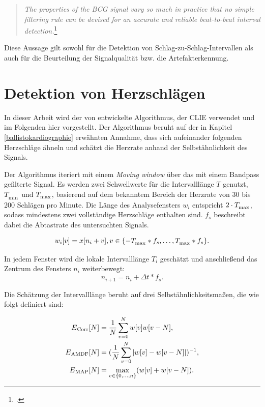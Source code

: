 	\begin{quote}\textit{The properties of the BCG signal vary so much in practice that no simple filtering rule can be devised for an accurate and reliable beat-to-beat interval detection.}\footcite{Paalasmaa2015}\end{quote}
	
	Diese Aussage gilt sowohl für die Detektion von Schlag-zu-Schlag-Intervallen als auch für die Beurteilung der Signalqualität bzw. die Artefakterkennung.

\section{Detektion von Herzschlägen}\label{CLIE}

	In dieser Arbeit wird der von \citeauthor{Bruser2013} entwickelte Algorithmus, der \acf{CLIE} verwendet und im Folgenden hier vorgestellt. Der Algorithmus beruht auf der in Kapitel \ref{ballistokardiographie} erwähnten Annahme, dass sich aufeinander folgenden Herzschläge ähneln und schätzt die Herzrate anhand der Selbstähnlichkeit des Signals.


	Der Algorithmus iteriert mit einem \textit{Moving window} über das mit einem Bandpass gefilterte Signal. Es werden zwei Schwellwerte für die Intervalllänge $T$ genutzt, $T_\textsubscript{min}$ und $T_\textsubscript{max}$, basierend auf dem bekanntem Bereich der Herzrate von 30 bis 200 Schlägen pro Minute. Die Länge des Analysefensters $w_i$ entspricht $2 \cdot T_\textsubscript{max}$, sodass mindestens zwei vollständige Herzschläge enthalten sind. $f_s$ beschreibt dabei die Abtastrate des untersuchten Signals.
	
	\[ %
		w_i[v] = x[n_i + v], v \in \{ -T_\textsubscript{max} * f_s, \ldots, T_\textsubscript{max} * f_s\}\text{.}
	\]
	
	In jedem Fenster wird die lokale Intervalllänge $T_i$ geschätzt und anschließend das Zentrum des Fensters $n_i$ weiterbewegt: \[ n_{i+1} = n_i + \Delta t * f_s\text{.} \]
	
	Die Schätzung der Intervalllänge beruht auf drei Selbstähnlichkeitsmaßen, die wie folgt definiert sind:
	
	\begin{align*}
		E\textsubscript{Corr}[N] &= \frac{1}{N} \sum_{v=0}^{N} w[v]w[v-N],\\
		E\textsubscript{AMDF}[N] &= (\frac{1}{N} \sum_{v=0}^{N} |w[v]-w[v-N]|)^{-1},\\
		E\textsubscript{MAP}[N] &= \max_{v \in \{0,...,n\}}(w[v]+w[v-N]).
	\end{align*}
 	
